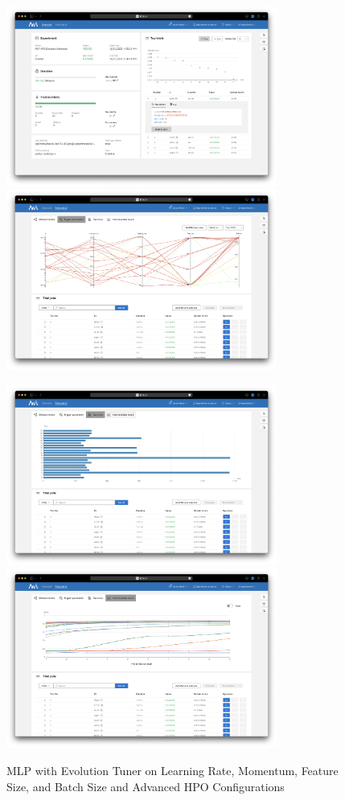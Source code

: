 \documentclass{article}
\begin{document}
\begin{figure}
    \centerline{\includegraphics[width=3.5in]{../proj3/figures/mlp_evolution_batch_advanced_overview.png}\includegraphics[width=3.5in]{../proj3/figures/mlp_evolution_batch_advanced_hyperparameter.png}}
    \centerline{\includegraphics[width=3.5in]{../proj3/figures/mlp_evolution_batch_advanced_latency.png}\includegraphics[width=3.5in]{../proj3/figures/mlp_evolution_batch_advanced_intermediate.png}}
    \caption{MLP with Evolution Tuner on Learning Rate, Momentum, Feature Size, and Batch Size and Advanced HPO Configurations}
    \label{fig:mlp-evolution-batch-advanced}
\end{figure}
\end{document}
